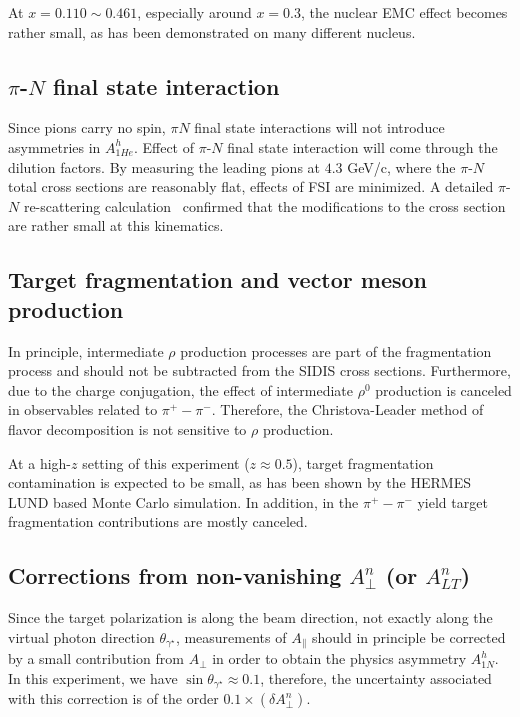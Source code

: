 At $x=0.110 \sim 0.461$, especially around $x=0.3$, the 
 nuclear EMC effect becomes rather small, as has been demonstrated 
on many different nucleus.

\subsection{$\pi$-$N$ final state interaction }
Since pions carry no spin,  $\pi N$ final state interactions will not introduce 
asymmetries in $A_{1He}^h$. Effect of $\pi$-$N$ final state interaction
will come through the dilution factors. By measuring the leading pions at
$4.3$ GeV/c, where the $\pi$-$N$ total cross sections are reasonably flat, 
effects of FSI are minimized. A detailed $\pi$-$N$ re-scattering calculation~\cite{misak}
confirmed that the modifications to the cross section are rather small at this kinematics.
 

\subsection{Target fragmentation and vector meson production }
 In principle, intermediate $\rho$ production processes are part
 of the fragmentation process and should not be subtracted
 from the SIDIS cross sections. Furthermore, 
 due to the charge conjugation, the effect of intermediate
 $\rho^0$ production is canceled in observables related to
 $\pi^+ - \pi^-$. Therefore, the Christova-Leader method of flavor decomposition
 is not sensitive to $\rho$ production.  

 At a high-$z$ setting of this experiment ($z \approx 0.5$), target fragmentation contamination is 
expected to be small, as has been shown by the HERMES LUND based Monte Carlo simulation. In addition, in the
$\pi^+ - \pi^-$ yield target fragmentation contributions are mostly canceled.


\subsection{Corrections from non-vanishing $A^n_{\perp}$ (or $A^n_{LT}$) }   
Since the target polarization is along the beam direction, not exactly along the
virtual photon  direction $\theta_{\gamma^{\star}}$, measurements of
$A_{\parallel}$ should in principle be corrected by a small contribution from $A_{\perp}$
in order to obtain the physics asymmetry $A_{1N}^h$.  
In this experiment, we have  $\sin \theta_{\gamma^{\star}} \approx 0.1$, therefore,
the uncertainty associated with this correction is of the order $0.1 \times (\delta A^n_{\perp})$. 

